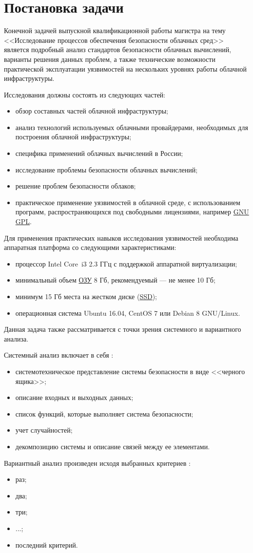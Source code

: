 \section{Постановка задачи}

Конечной задачей выпускной квалификационной работы магистра на тему <<Исследование процессов обеспечения безопасности облачных сред>> является подробный анализ стандартов безопасности облачных вычислений, варианты решения данных проблем, а также технические возможности практической эксплуатации уязвимостей на нескольких уровнях работы облачной инфраструктуры.

Исследования должны состоять из следующих частей:
\begin{itemize}
  \item обзор составных частей облачной инфраструктуры;
  \item анализ технологий используемых облачными провайдерами, необходимых для построения облачной инфраструктуры;
  \item специфика применений облачных вычислений в России;
  \item исследование проблемы безопасности облачных вычислений;
  \item решение проблем безопасности облаков;
  \item практическое применение уязвимостей в облачной среде, с использованием программ, распространяющихся под свободными лицензиями, например \hyperlink{gnu}{GNU} \hyperlink{gpl}{GPL}.
\end{itemize}

Для применения практических навыков исследования уязвимостей необходима аппаратная платформа со следующими характеристиками:
\begin{itemize}
  \item процессор Intel Core\textregistered~i3 2.3 ГГц с поддержкой аппаратной виртуализации;
  \item минимальный объем \hyperlink{ram}{ОЗУ} 8 Гб, рекомендуемый --- не менее 10 Гб;
  \item минимум 15 Гб места на жестком диске (\hyperlink{ssd}{SSD});
  \item операционная система Ubuntu 16.04, CentOS 7 или Debian 8 GNU/Linux.
\end{itemize}

Данная задача также рассматривается с точки зрения системного и вариантного анализа.

Системный анализ включает в себя \cite{sys-analyz}:
\begin{itemize}
  \item системотехническое представление системы безопасности в виде <<черного ящика>>;
  \item описание входных и выходных данных;
  \item список функций, которые выполняет система безопасности;
  \item учет случайностей;
  \item декомпозицию системы и описание связей между ее элементами.
\end{itemize}

Вариантный анализ произведен исходя выбранных критериев \cite{var-analyz}:
\begin{itemize}
  \item раз;
  \item два;
  \item три;
  \item ...;
  \item последний критерий.
\end{itemize}

\clearpage
